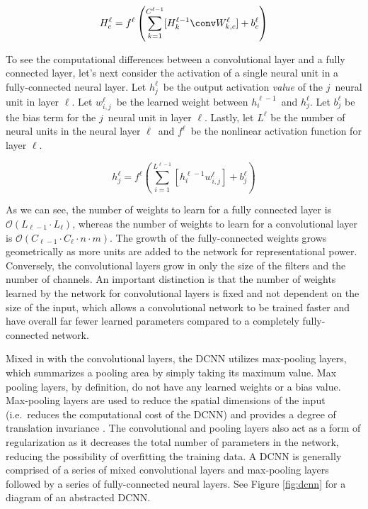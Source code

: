 \begin{equation}
	\label{eq:convolution}
	H_c^\ell = f^\ell \left(\sum_{k=1}^{C^{\ell - 1}} [ H_k^{\ell-1} \conv W_{k,c}^\ell ] + b_{c}^\ell \right)
\end{equation}

To see the computational differences between a convolutional layer and a fully connected layer, let's next consider the activation of a single neural unit in a fully-connected neural layer.  Let $h_j^\ell$\ be the output activation \textit{value} of the $j$\th\ neural unit in layer $\ell$.  Let $w_{i,j}^\ell$\ be the learned weight between $h_i^{\ell - 1}$\ and $h_j^\ell$.  Let $b_j^\ell$ be the bias term for the $j$\th\ neural unit in layer $\ell$.  Lastly, let $L^{\ell}$ be the number of neural units in the neural layer $\ell$\ and $f^\ell$\ be the nonlinear activation function for layer $\ell$.

\begin{equation}
	\label{eq:fully-connected}
	h_j^\ell = f^\ell \left(\sum_{i=1}^{L^{\ell - 1}} [ h_i^{\ell - 1} w_{i,j}^\ell ] + b_j^\ell\right)
\end{equation}

As we can see, the number of weights to learn for a fully connected layer is $\mathcal{O}(L_{\ell - 1} \cdot L_{\ell})$, whereas the number of weights to learn for a convolutional layer is $\mathcal{O} (C_{\ell - 1} \cdot C_{\ell} \cdot n \cdot m)$.  The growth of the fully-connected weights grows geometrically as more units are added to the network for representational power.  Conversely, the convolutional layers grow in only the size of the filters and the number of channels.  An important distinction is that the number of weights learned by the network for convolutional layers is fixed and not dependent on the size of the input, which allows a convolutional network to be trained faster and have overall far fewer learned parameters compared to a completely fully-connected network.  

Mixed in with the convolutional layers, the DCNN utilizes max-pooling layers, which summarizes a pooling area by simply taking its maximum value.  Max pooling layers, by definition, do not have any learned weights or a bias value.   Max-pooling layers are used to reduce the spatial dimensions of the input (i.e.\ reduces the computational cost of the DCNN) and provides a degree of translation invariance \cite{lee_convolutional_2009, riesenhuber_models_2000}.  The convolutional and pooling layers also act as a form of regularization as it decreases the total number of parameters in the network, reducing the possibility of overfitting the training data.  A DCNN is generally comprised of a series of mixed convolutional layers and max-pooling layers followed by a series of fully-connected neural layers.  See Figure \ref{fig:dcnn} for a diagram of an abstracted DCNN.

